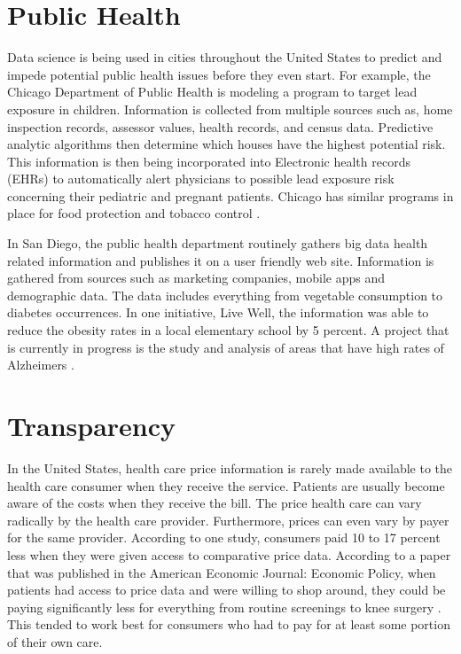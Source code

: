 \documentclass[sigconf]{acmart}
\begin{document}
\section{Public Health}

Data science is being used in cities throughout the United States to predict and impede potential public health issues before they even start.  For example, the Chicago Department of Public Health is modeling a program to target lead exposure in children.  Information is collected from multiple sources such as, home inspection records, assessor values, health records, and census data.  Predictive analytic algorithms then determine which houses have the highest potential risk.  This information is then being incorporated into Electronic health records (EHRs) to automatically alert physicians to possible lead exposure risk concerning their pediatric and pregnant patients.  Chicago has similar programs in place for food protection and tobacco control \cite{www-google-chicago}.

In San Diego, the public health department routinely gathers big data health related information and publishes it on a user friendly web site. Information is gathered from sources such as marketing companies, mobile apps and demographic data.  The data includes everything from vegetable consumption to diabetes occurrences.  In one initiative, Live Well, the information was able to reduce the obesity rates in a local elementary school by 5 percent. A project that is currently in progress is the study and analysis of areas that have high rates of Alzheimers \cite{www-google-sandiego}. 


\section{Transparency}
In the United States, health care price information is rarely made available to the health care consumer when they receive the service. Patients are usually become aware of the costs when they receive the bill. The price health care can vary radically by the health care provider. Furthermore, prices can even vary by payer for the same provider.  According to one study, consumers paid 10 to 17 percent less when they were given access to comparative price data.  According to a paper that was published in the American Economic Journal: Economic Policy, when patients had access to price data and were willing to shop around, they could be paying significantly less for everything from routine screenings to knee surgery \cite{www-google-transparent}.  This tended to work best for consumers who had to pay for at least some portion of their own care. 
\end{document}
